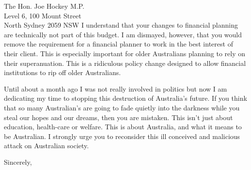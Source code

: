 \documentclass{letter}
\begin{document}
\begin{letter}{The Hon. Joe Hockey M.P. \\ Level 6, 100 Mount Street \\ North Sydney 2059 NSW }
I understand that your changes to financial planning are technically not part of this
budget. I am dismayed, however, that you would remove the requirement for a financial planner
to work in the best interest of their client. This is especially important for older
Australians planning to rely on their superanuation. This is a ridiculous policy change
designed to allow financial institutions to rip off older Australians.

Until about a month ago I was not really involved in politics but now I am dedicating my time
to stopping this destruction of Australia's future. If you think 
that so many Australian's are going to fade quietly into the darkness while you steal our
hopes and our dreams, then you are mistaken. This isn't just about education, health-care or welfare. 
This is about Australia, and what it means to be Australian. I strongly urge you to reconsider this ill conceived
and malicious attack on Australian society. 


\closing{Sincerely,}

\end{letter}
\end{document}
